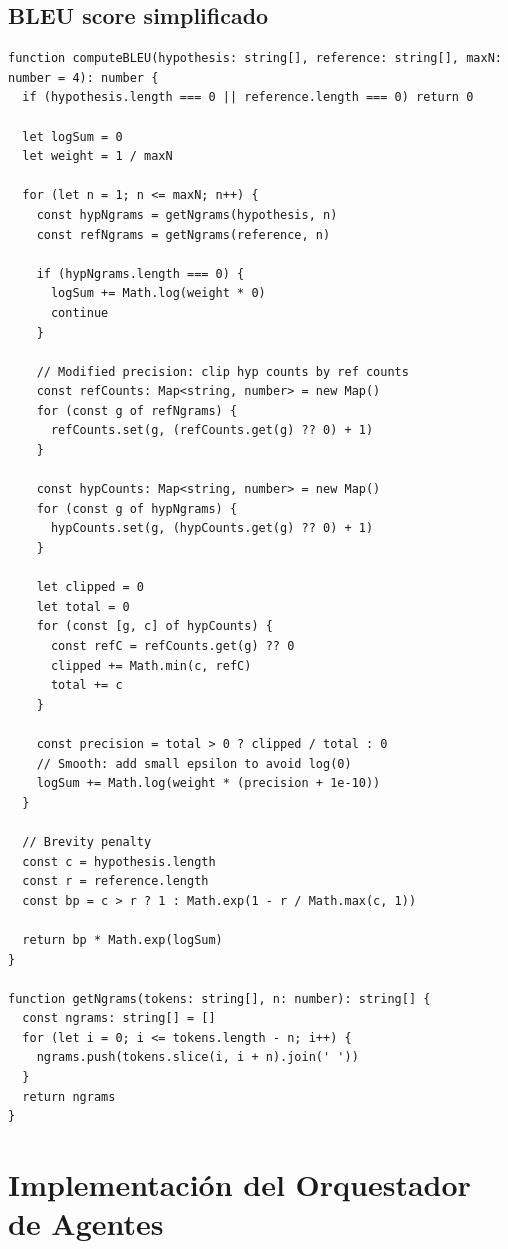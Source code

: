\section{BLEU score simplificado}

\begin{lstlisting}[style=ts,caption={Cálculo de BLEU score para traducción}]
function computeBLEU(hypothesis: string[], reference: string[], maxN: number = 4): number {
  if (hypothesis.length === 0 || reference.length === 0) return 0

  let logSum = 0
  let weight = 1 / maxN

  for (let n = 1; n <= maxN; n++) {
    const hypNgrams = getNgrams(hypothesis, n)
    const refNgrams = getNgrams(reference, n)

    if (hypNgrams.length === 0) {
      logSum += Math.log(weight * 0)
      continue
    }

    // Modified precision: clip hyp counts by ref counts
    const refCounts: Map<string, number> = new Map()
    for (const g of refNgrams) {
      refCounts.set(g, (refCounts.get(g) ?? 0) + 1)
    }

    const hypCounts: Map<string, number> = new Map()
    for (const g of hypNgrams) {
      hypCounts.set(g, (hypCounts.get(g) ?? 0) + 1)
    }

    let clipped = 0
    let total = 0
    for (const [g, c] of hypCounts) {
      const refC = refCounts.get(g) ?? 0
      clipped += Math.min(c, refC)
      total += c
    }

    const precision = total > 0 ? clipped / total : 0
    // Smooth: add small epsilon to avoid log(0)
    logSum += Math.log(weight * (precision + 1e-10))
  }

  // Brevity penalty
  const c = hypothesis.length
  const r = reference.length
  const bp = c > r ? 1 : Math.exp(1 - r / Math.max(c, 1))

  return bp * Math.exp(logSum)
}

function getNgrams(tokens: string[], n: number): string[] {
  const ngrams: string[] = []
  for (let i = 0; i <= tokens.length - n; i++) {
    ngrams.push(tokens.slice(i, i + n).join(' '))
  }
  return ngrams
}
\end{lstlisting}

\chapter{Implementación del Orquestador de Agentes}
\label{app:orchestrator-code}

